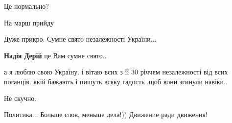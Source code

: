 \begin{itemize}
Це нормально?

 
На марш прийду

 
Дуже прикро. Сумне свято незалежності України...

\begin{itemize}
 
\textbf{Надія Дерій} це Вам сумне свято..

 

а я люблю свою Україну. і вітаю всих з її 30 річчям незалежності від всих
поганців. якій бажають і пишуть всяку гадость .щоб вони згинули навіки..

\end{itemize}

 
Не скучно.

 

Политика...
Больше слов, меньше дела!))
Движение ради движения!

\begin{itemize}
 

\end{itemize}
\end{itemize}
